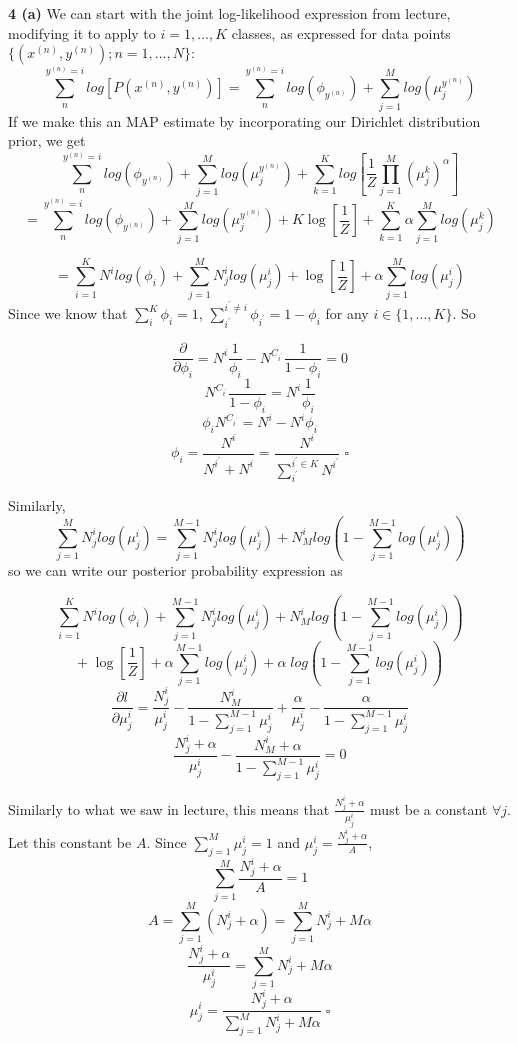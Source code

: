 \documentclass[12 pt]{article}        	%
\begin{document}
\newpage

\textbf{4 (a)} We can start with the joint log-likelihood expression from lecture, modifying it to apply to $ i = 1, ..., K $ classes,
as expressed for data points $ \{(x^{(n)}, y^{(n)}); n = 1, ..., N\} $:
\[
  \sum_{n}^{y^{(n)} = i} log [P(x^{(n)}, y^{(n)})] = \sum_{n}^{y^{(n)} = i} log ( \phi_{y^{(n)}} ) + \sum_{j=1}^{M} log (\mu_{j}^{y^{(n)}})
\]
If we make this an MAP estimate by incorporating our Dirichlet distribution prior, we get
\[
  \sum_{n}^{y^{(n)} = i} log ( \phi_{y^{(n)}} ) + \sum_{j=1}^{M} log (\mu_{j}^{y^{(n)}})
  + \sum_{k=1}^{K} log [ \frac{1}{Z} \prod_{j=1}^{M}(\mu_{j}^{k})^\alpha ]
\]
\[
  = \sum_{n}^{y^{(n)} = i} log ( \phi_{y^{(n)}} ) + \sum_{j=1}^{M} log (\mu_{j}^{y^{(n)}})
  + K \log [ \frac{1}{Z} ] 
  + \sum_{k=1}^{K} \alpha \sum_{j=1}^{M} log ( \mu_{j}^{k} )
\]

\[
  = 
  \sum_{i=1}^{K} N^{i} log(\phi_i) 
  + \sum_{j=1}^{M} N_{j}^{i} log (\mu_{j}^{i})
  + \log [ \frac{1}{Z} ]
  + \alpha \sum_{j=1}^{M} log ( \mu_{j}^{i} )
\]
Since we know that $ \sum_{i}^{K} \phi_i = 1 $, 
$ \sum_{i^\prime}^{i^\prime \neq i} \phi_{i^{\prime}} = 1 - \phi_i $ for any $ i \in \{ 1, ..., K \} $. So

\[
  \frac{\partial}{\partial \phi_i} = 
  N^{i} \frac{1}{\phi_i} - N^{C_{i^{\prime}}} \frac{1}{1 - \phi_i} = 0
\]
\[
  N^{C_{i^{\prime}}} \frac{1}{1 - \phi_i} = 
  N^{i} \frac{1}{\phi_i}
\]
\[
  \phi_i N^{C_{i^{\prime}}}  = 
  N^{i} - N^{i} \phi_i
\]
\[
  \phi_i = 
  \frac{ N^{i} }{ N^{i^{\prime}} + N^{i} }
  = \frac{ N^{i} }{ \sum_{i^{\prime}}^{i^{\prime} \in K} N^{i^{\prime}} } \; \square
\]

Similarly, 
\[
  \sum_{j=1}^{M} N_{j}^{i} log (\mu_{j}^{i}) 
  = \sum_{j=1}^{M-1} N_{j}^{i} log(\mu_{j}^{i}) 
  + N_{M}^{i} log(1 - \sum_{j=1}^{M-1} log(\mu_{j}^{i}))
\]
\newpage
so we can write our posterior probability expression as 

\[
  \sum_{i=1}^{K} N^{i} log(\phi_i) 
  + \sum_{j=1}^{M-1} N_{j}^{i} log(\mu_{j}^{i}) 
  + N_{M}^{i} log(1 - \sum_{j=1}^{M-1} log(\mu_{j}^{i}))
\]
\[
  + \; \log [ \frac{1}{Z} ]
  + \alpha \sum_{j=1}^{M-1} log(\mu_{j}^{i})
  + \alpha \; log(1 - \sum_{j=1}^{M-1} log(\mu_{j}^{i}))
\]
\[
  \frac{\partial l}{\partial \mu_{j}^{i}}
  = 
  \frac{N_{j}^{i}}{\mu_{j}^{i}}
  - \frac{
    N_{M}^{i}
  }{
    1 - \sum_{j=1}^{M-1} \mu_{j}^{i}
  }
  + \frac{\alpha}{\mu_{j}^{i}}
  - \frac{
    \alpha
  }{
    1 - \sum_{j=1}^{M-1} \mu_{j}^{i}
  }
\]
\[
  \frac{N_{j}^{i} + \alpha}{\mu_{j}^{i}}
  - \frac{
    N_{M}^{i} + \alpha 
  }{
    1 - \sum_{j=1}^{M-1} \mu_{j}^{i}
  } = 0
\]

Similarly to what we saw in lecture, this means that 
$ \frac{N_{j}^{i} + \alpha}{\mu_{j}^{i}} $ must be a constant $ \forall j $. Let this constant be $ A $.
Since $ \sum_{j=1}^{M} \mu_{j}^{i} = 1 $ and $ \mu_{j}^{i} = \frac{N_{j}^{i} + \alpha}{A} $,
\[
  \sum_{j=1}^{M} \frac{N_{j}^{i} + \alpha}{A} = 1
\]
\[
  A = \sum_{j=1}^{M} ( N_{j}^{i} + \alpha )
  = \sum_{j=1}^{M} N_{j}^{i} + M \alpha
\]
\[
  \frac{N_{j}^{i} + \alpha}{\mu_{j}^{i}} = \sum_{j=1}^{M} N_{j}^{i} + M \alpha
\]
\[
  \mu_{j}^{i} = \frac{N_{j}^{i} + \alpha}{\sum_{j=1}^{M} N_{j}^{i} + M \alpha} \; \square
\]
\end{document}
